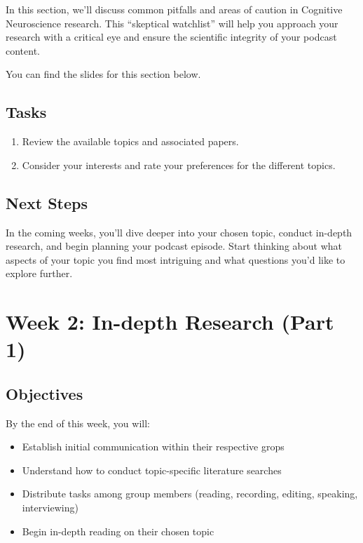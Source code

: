 \documentclass[
  letterpaper,
  DIV=11,
  numbers=noendperiod]{scrreprt}
\providecommand{\tightlist}{%
  \setlength{\itemsep}{0pt}\setlength{\parskip}{0pt}}\usepackage{longtable,booktabs,array}
\begin{document}
In this section, we'll discuss common pitfalls and areas of caution in
Cognitive Neuroscience research. This ``skeptical watchlist'' will help
you approach your research with a critical eye and ensure the scientific
integrity of your podcast content.

You can find the slides for this section below.

\section{Tasks}\label{tasks}

\begin{enumerate}
\def\labelenumi{\arabic{enumi}.}
\tightlist
\item
  Review the available topics and associated papers.
\item
  Consider your interests and rate your preferences for the different
  topics.
\end{enumerate}

\section{Next Steps}\label{next-steps-1}

In the coming weeks, you'll dive deeper into your chosen topic, conduct
in-depth research, and begin planning your podcast episode. Start
thinking about what aspects of your topic you find most intriguing and
what questions you'd like to explore further.

\chapter{Week 2: In-depth Research (Part
1)}\label{week-2-in-depth-research-part-1-1}

\section{Objectives}\label{objectives-1}

By the end of this week, you will:

\begin{itemize}
\tightlist
\item
  Establish initial communication within their respective grops
\item
  Understand how to conduct topic-specific literature searches
\item
  Distribute tasks among group members (reading, recording, editing,
  speaking, interviewing)
\item
  Begin in-depth reading on their chosen topic
\end{itemize}
\end{document}
